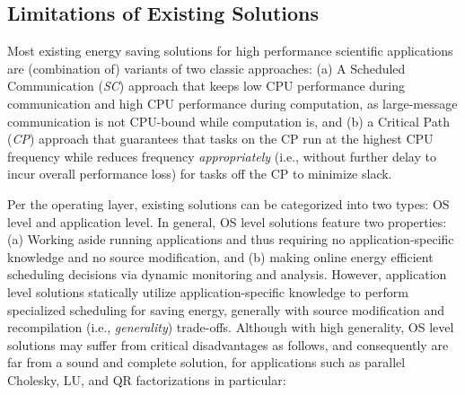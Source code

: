 \documentclass[12pt]{elsarticle}
\begin{document}
\subsection{Limitations of Existing Solutions}

Most existing energy saving solutions for high performance scientific applications are (combination of) variants of two classic approaches: (a) A Scheduled Communication (\emph{SC}) approach \cite{ipdps05a} \cite{cluster06} \cite{sc06} \cite{sc07} that keeps low CPU performance during communication and high CPU performance during computation, as large-message communication is not CPU-bound while computation is, and (b) a Critical Path (\emph{CP}) approach \cite{sc07} \cite{ics09} \cite{hpcs11} \cite{csrd12a} that guarantees that tasks on the CP run at the highest CPU frequency while reduces frequency \emph{appropriately} (i.e., without further delay to incur overall performance loss) for tasks off the CP to minimize slack.

Per the operating layer, existing solutions can be categorized into two types: OS level and application level. In general, OS level solutions feature two properties: (a) Working aside running applications and thus requiring no application-specific knowledge and no source modification, and (b) making online energy efficient scheduling decisions via dynamic monitoring and analysis. However, application level solutions statically utilize application-specific knowledge to perform specialized scheduling for saving energy, generally with source modification and recompilation (i.e., \emph{generality}) trade-offs. Although with high generality, OS level solutions may suffer from critical disadvantages as follows, and consequently are far from a sound and complete solution, for applications such as parallel Cholesky, LU, and QR factorizations in particular:
\end{document}
